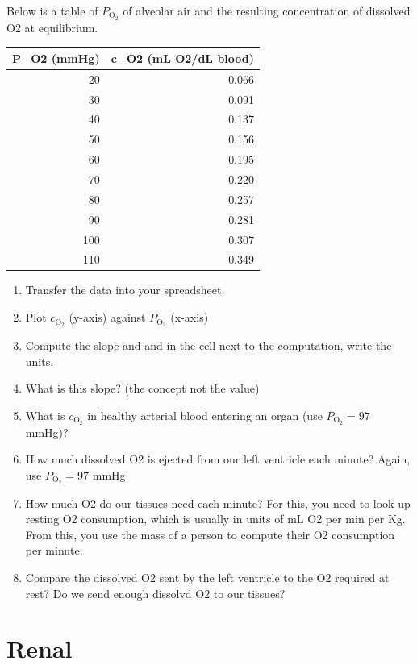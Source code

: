 \documentclass[]{book}
\begin{document}
Below is a table of \(P_\mathrm{O_2}\) of alveolar air and the resulting
concentration of dissolved O2 at equilibrium.

\begin{tabular}{r|r}
\hline
P\_O2 (mmHg) & c\_O2 (mL O2/dL blood)\\
\hline
20 & 0.066\\
\hline
30 & 0.091\\
\hline
40 & 0.137\\
\hline
50 & 0.156\\
\hline
60 & 0.195\\
\hline
70 & 0.220\\
\hline
80 & 0.257\\
\hline
90 & 0.281\\
\hline
100 & 0.307\\
\hline
110 & 0.349\\
\hline
\end{tabular}

\begin{enumerate}
\def\labelenumi{\arabic{enumi}.}
\item
  Transfer the data into your spreadsheet.
\item
  Plot \(c_\mathrm{O_2}\) (y-axis) against \(P_\mathrm{O_2}\) (x-axis)
\item
  Compute the slope and and in the cell next to the computation, write
  the units.
\item
  What is this slope? (the concept not the value)
\item
  What is \(c_\mathrm{O_2}\) in healthy arterial blood entering an organ
  (use \(P_\mathrm{O_2} = 97\) mmHg)?
\item
  How much dissolved O2 is ejected from our left ventricle each minute?
  Again, use \(P_\mathrm{O_2} = 97\) mmHg
\item
  How much O2 do our tissues need each minute? For this, you need to
  look up resting O2 consumption, which is usually in units of mL O2 per
  min per Kg. From this, you use the mass of a person to compute their
  O2 consumption per minute.
\item
  Compare the dissolved O2 sent by the left ventricle to the O2 required
  at rest? Do we send enough dissolvd O2 to our tissues?
\end{enumerate}

\chapter{Renal}\label{renal}
\end{document}
